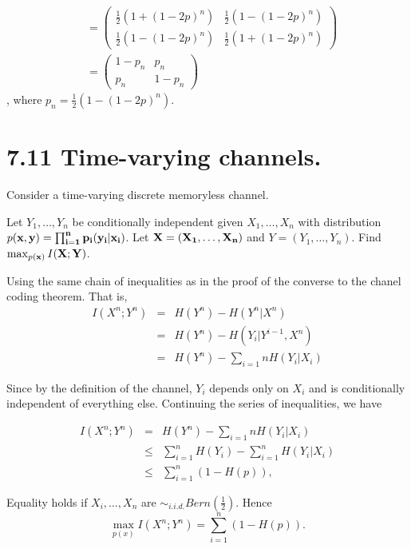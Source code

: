 \documentclass[10pt]{article}
\begin{document}
\begin{tiny}
\begin{multicols}{3}
\begin{align*}
&= \begin{pmatrix}
        \frac{1}{2}(1 + (1-2p)^n) & \frac{1}{2}(1 - (1-2p)^n) \\
        \frac{1}{2}(1 - (1-2p)^n) & \frac{1}{2}(1 + (1-2p)^n) \end{pmatrix}  \\
    &= \begin{pmatrix} 1 - p_n & p_n \\
        p_n & 1 - p_n \end{pmatrix} 
\end{align*} , where  $p_n = \frac{1}{2}(1 - (1-2p)^n)$.

\section*{7.11 Time-varying channels.}
Consider a time-varying discrete memoryless channel.

Let $Y_1,\dots,Y_n$ be conditionally independent given $X_1,\dots,X_n$ with distribution $p(\bf{x}, \bf{y}) = \prod_{i=1}^{n}p_i(y_i|x_i)$. Let $\bf{X} = (X_1,\dots,X_n)$ and $Y=(Y_1,\dots,Y_n)$. Find $\max_{p(\bf{x})} I(\bf{X};\bf{Y})$.

Using the same chain of inequalities as in the proof of the converse to the chanel coding theorem. That is,
\begin{eqnarray*}
    I(X^n;Y^n) &=& H(Y^n) - H(Y^n|X^n) \\ 
        &=& H(Y^n) - H(Y_i | Y^{i-1}, X^n)  \\
        &=& H(Y^n) - \sum_{i=1}{n} H(Y_i | X_i)
\end{eqnarray*}

Since by the definition of the channel, $Y_i$ depends only on $X_i$ and is conditionally independent of everything else. Continuing the series of inequalities, we have

\begin{eqnarray*}
    I(X^n;Y^n) &=& H(Y^n) - \sum_{i=1}{n} H(Y_i | X_i) \\
    &\le& \sum_{i=1}^{n} H(Y_i) - \sum_{i=1}^{n}H(Y_i | X_i) \\ 
    &\le& \sum_{i=1}^{n} (1-H(p)),
\end{eqnarray*}

Equality holds if $X_i,\dots,X_n$ are $\sim_{i.i.d.} Bern(\frac{1}{2})$. Hence
\begin{equation*}
    \max_{p(x)} I(X^n; Y^n) = \sum_{i=1}^{n}(1-H(p)).
\end{equation*}


\end{multicols}
\end{tiny}
\end{document}
